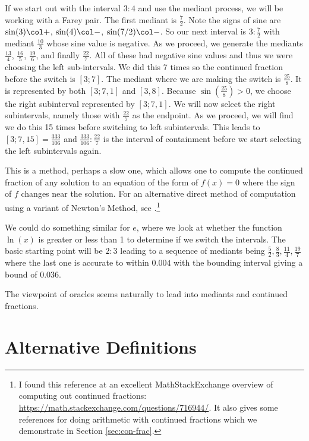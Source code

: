 \documentclass[12pt]{article}
\begin{document}
If we start out with the interval  $3:4$ and use the mediant process, we will be working with a Farey pair. The first mediant is $\frac{7}{2}$. Note the signs of sine are  $\sin(3) \col +$, $\sin(4) \col -$, $\sin(7/2) \col -$. So our next interval is $3:\frac{7}{2}$ with mediant $\frac{10}{3}$ whose sine value is negative. As we proceed, we generate the mediants $\frac{13}{4}$, $\frac{16}{5}$, $\frac{19}{6}$, and finally $\frac{22}{7}$. All of these had negative sine values and thus we were choosing the left sub-intervals. We did this 7 times so the continued fraction before the switch is $[3;7]$. The mediant where we are making the switch is $\frac{25}{8}$. It is represented by both $[3; 7, 1]$ and $[3, 8]$.  Because $\sin(\frac{25}{8}) > 0$, we choose the right subinterval represented by $[3; 7, 1]$. We will now select the right subintervals, namely those with $\frac{22}{7}$ as the endpoint. As we proceed, we will find we do this 15 times before switching to left subintervals. This leads to $[3; 7, 15] = \frac{333}{106}$ and $\frac{333}{106}:\frac{22}{7}$ is the interval of containment before we start selecting the left subintervals again.

This is a method, perhaps a slow one, which allows one to compute the continued fraction of any solution to an equation of the form of $f(x) =0$ where the sign of $f$ changes near the solution. For an alternative direct method of computation using a variant of Newton's Method, see \cite{shiu95}.\footnote{I found this reference at an excellent MathStackExchange overview of computing out continued fractions: \url{https://math.stackexchange.com/questions/716944/}.  It also gives some references for doing arithmetic with continued fractions which we demonstrate in Section \ref{sec:con-frac}.} 

We could do something similar for $e$, where we look at whether the function $\ln(x)$ is greater or less than 1 to determine if we switch the intervals. The basic starting point will be $2:3$ leading to a sequence of mediants being $\frac{5}{2}, \frac{8}{3}, \frac{11}{4}, \frac{19}{7}$ where the last one is accurate to within $0.004$ with the bounding interval giving a bound of $0.036$. 

The viewpoint of oracles seems naturally to lead into mediants and continued fractions. 


\section{Alternative Definitions}\label{sec:others}
\end{document}
